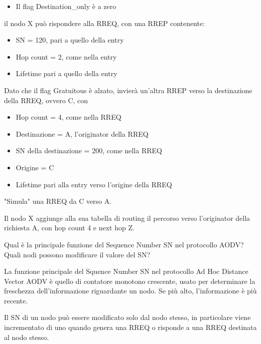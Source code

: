 \begin{questions}
\begin{solution}
\begin{itemize}
            \item Il flag Destination\_only è a zero
        \end{itemize}
        il nodo X può rispondere alla RREQ, con una RREP contenente: 
        \begin{itemize}
            \item SN = 120, pari a quello della entry
            
            \item Hop count = 2, come nella entry
            
            \item Lifetime pari a quello della entry
        \end{itemize}
        
        Dato che il flag Gratuitous è alzato, invierà un'altra RREP verso la destinazione della RREQ, ovvero C, con
        \begin{itemize}
            \item Hop count = 4, come nella RREQ
            
            \item Destinazione = A, l'originator della RREQ
            
            \item SN della destinazione = 200, come nella RREQ
            
            \item Origine = C
            
            \item Lifetime pari alla entry verso l'origine della RREQ
        \end{itemize}
        
        "Simula" una RREQ da C verso A.
        
        Il nodo X aggiunge alla sua tabella di routing il percorso verso l'originator della richiesta A, con hop count 4 e next hop Z.
    \end{solution}
    
    \question Qual è la principale funzione del Sequence Number SN nel protocollo AODV? Quali nodi possono modificare il valore del SN?
    
    \begin{solution}
        La funzione principale del Squence Number SN nel protocollo Ad Hoc Distance Vector AODV è quello di contatore monotono crescente, usato per determinare la freschezza dell'informazione riguardante un nodo. Se più alto, l'informazione è più recente.
        
        Il SN di un nodo può essere modificato solo dal nodo stesso, in particolare viene incrementato di uno quando genera una RREQ o risponde a una RREQ destinata al nodo stesso.
    \end{solution}
\end{questions}